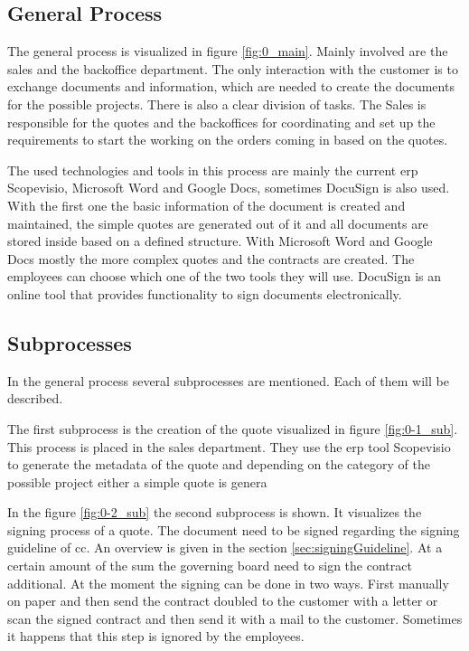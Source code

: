 \subsection*{General Process}
The general process is visualized in figure \ref{fig:0_main}. Mainly involved are the sales and the backoffice department. The only interaction with the customer is to exchange documents and information, which are needed to create the documents for the possible projects. There is also a clear division of tasks. The Sales is responsible for the quotes and the backoffices for coordinating and set up the requirements to start the working on the orders coming in based on the quotes.

The used technologies and tools in this process are mainly the current \gls{erp} Scopevisio, Microsoft Word and Google Docs, sometimes DocuSign is also used. With the first one the basic information of the document is created and maintained, the simple quotes are generated out of it and all documents are stored inside based on a defined structure. With Microsoft Word and Google Docs mostly the more complex quotes and the contracts are created. The employees can choose which one of the two tools they will use. DocuSign is an online tool that provides functionality to sign documents electronically.

\subsection*{Subprocesses}
In the general process several subprocesses are mentioned. Each of them will be described.

The first subprocess is the creation of the quote visualized in figure \ref{fig:0-1_sub}. This process is placed in the sales department. They use the \gls{erp} tool Scopevisio to generate the metadata of the quote and depending on the category of the possible project either a simple quote is genera

In the figure \ref{fig:0-2_sub} the second subprocess is shown. It visualizes the signing process of a quote. The document need to be signed regarding the signing guideline of \gls{cc}. An overview is given in the section \ref{sec:signingGuideline}. At a certain amount of the sum the governing board need to sign the contract additional. At the moment the signing can be done in two ways. First manually on paper and then send the contract doubled to the customer with a letter or scan the signed contract and then send it with a mail to the customer. Sometimes it happens that this step is ignored by the employees.

